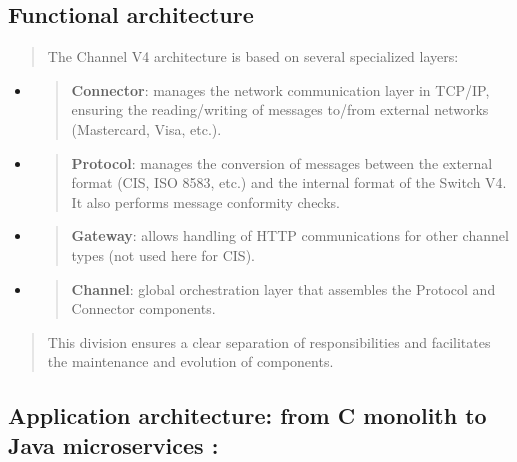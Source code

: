\documentclass[12pt,a4paper]{report}
\begin{document}
\hypertarget{functional-architecture}{%
\subsection{\texorpdfstring{\textbf{Functional
architecture}}{Functional architecture}}\label{functional-architecture}}

\begin{quote}
The Channel V4 architecture is based on several specialized layers:
\end{quote}

\begin{itemize}
\item
  \begin{quote}
  \textbf{Connector}: manages the network communication layer in TCP/IP,
  ensuring the reading/writing of messages to/from external networks
  (Mastercard, Visa, etc.).
  \end{quote}
\item
  \begin{quote}
  \textbf{Protocol}: manages the conversion of messages between the
  external format (CIS, ISO 8583, etc.) and the internal format of the
  Switch V4. It also performs message conformity checks.
  \end{quote}
\item
  \begin{quote}
  \textbf{Gateway}: allows handling of HTTP communications for other
  channel types (not used here for CIS).
  \end{quote}
\item
  \begin{quote}
  \textbf{Channel}: global orchestration layer that assembles the
  Protocol and Connector components.
  \end{quote}
\end{itemize}

\begin{quote}
This division ensures a clear separation of responsibilities and
facilitates the maintenance and evolution of components.
\end{quote}

\hypertarget{application-architecture-from-c-monolith-to-java-microservices}{%
\subsection{\texorpdfstring{\textbf{Application architecture: from C
monolith to Java microservices
:}}{Application architecture: from C monolith to Java microservices :}}\label{application-architecture-from-c-monolith-to-java-microservices}}
\end{document}
